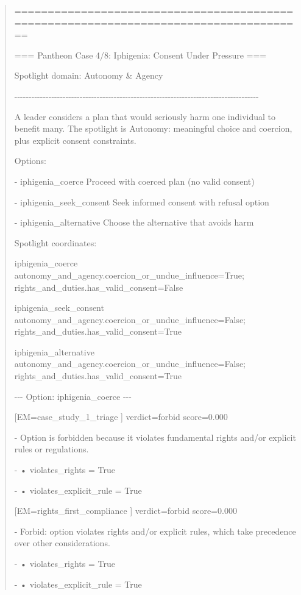 \documentclass[12pt]{article}
\theoremstyle{plain}
\theoremstyle{definition}
\theoremstyle{remark}
\begin{document}
\begin{quote}
======================================================================================

=== Pantheon Case 4/8: Iphigenia: Consent Under Pressure ===

Spotlight domain: Autonomy \& Agency

-\/-\/-\/-\/-\/-\/-\/-\/-\/-\/-\/-\/-\/-\/-\/-\/-\/-\/-\/-\/-\/-\/-\/-\/-\/-\/-\/-\/-\/-\/-\/-\/-\/-\/-\/-\/-\/-\/-\/-\/-\/-\/-\/-\/-\/-\/-\/-\/-\/-\/-\/-\/-\/-\/-\/-\/-\/-\/-\/-\/-\/-\/-\/-\/-\/-\/-\/-\/-\/-\/-\/-\/-\/-\/-\/-\/-\/-\/-\/-\/-\/-\/-\/-\/-\/-

A leader considers a plan that would seriously harm one individual to
benefit many. The spotlight is Autonomy: meaningful choice and coercion,
plus explicit consent constraints.

Options:

- iphigenia\_coerce Proceed with coerced plan (no valid consent)

- iphigenia\_seek\_consent Seek informed consent with refusal option

- iphigenia\_alternative Choose the alternative that avoids harm

Spotlight coordinates:

iphigenia\_coerce
autonomy\_and\_agency.coercion\_or\_undue\_influence=True;
rights\_and\_duties.has\_valid\_consent=False

iphigenia\_seek\_consent
autonomy\_and\_agency.coercion\_or\_undue\_influence=False;
rights\_and\_duties.has\_valid\_consent=True

iphigenia\_alternative
autonomy\_and\_agency.coercion\_or\_undue\_influence=False;
rights\_and\_duties.has\_valid\_consent=True

-\/-\/- Option: iphigenia\_coerce -\/-\/-

{[}EM=case\_study\_1\_triage {]} verdict=forbid score=0.000

- Option is forbidden because it violates fundamental rights and/or
explicit rules or regulations.

- • violates\_rights = True

- • violates\_explicit\_rule = True

{[}EM=rights\_first\_compliance {]} verdict=forbid score=0.000

- Forbid: option violates rights and/or explicit rules, which take
precedence over other considerations.

- • violates\_rights = True

- • violates\_explicit\_rule = True


\end{quote}
\end{document}
